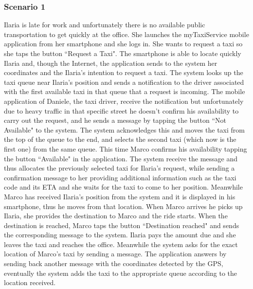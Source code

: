 \documentclass[a4paper,12pt]{article}%
\begin{document}
\subsubsection{Scenario 1}
Ilaria is late for work and unfortunately there is no available public transportation to get quickly at the office. She launches the myTaxiService mobile application from her smartphone and she logs in.
She wants to request a taxi so she taps the button ``Request a Taxi".
The smartphone is able to locate quickly Ilaria and, though the Internet, the application sends to the system her coordinates and the Ilaria's intention to request a taxi. The system looks up the taxi queue near Ilaria's position and sends a notification to the driver associated with the first available taxi in that queue that a request is incoming.
The mobile application of Daniele, the taxi driver, receive the notification but unfortunately due to heavy traffic in that specific street he doesn't confirm his availability to carry out the request, and he sends a message by tapping the button ``Not Available" to the system.
The system acknowledges this and moves the taxi from the top of the queue to the end, and selects the second taxi (which now is the first one) from the same queue.
This time Marco confirms his availability tapping the button ``Available" in the application. The system receive the message and thus allocates the previously selected taxi for Ilaria's request, while sending a confirmation message to her providing additional information such as the taxi code and its ETA and she waits for the taxi to come to her position.
Meanwhile Marco has received Ilaria's position from the system and it is displayed in his smartphone, thus he moves from that location.
When Marco arrives he picks up Ilaria, she provides the destination to Marco and the ride starts.
When the destination is reached, Marco taps the button ``Destination reached" and sends the corresponding message to the system. Ilaria pays the amount due and she leaves the taxi and reaches the office. Meanwhile the system asks for the exact location of Marco's taxi by sending a message. The application answers by sending back another message with the coordinates detected by the GPS, eventually the system adds the taxi to the appropriate queue according to the location received.
\end{document}
